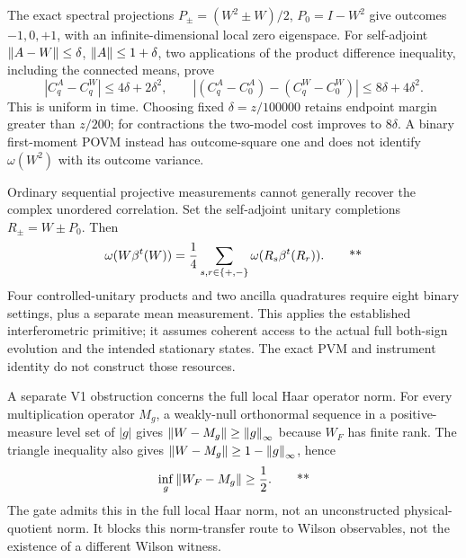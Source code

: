 The exact spectral projections
$P_\pm=(W^2\pm W)/2$, $P_0=I-W^2$ give outcomes $-1,0,+1$, with an
infinite-dimensional local zero eigenspace.  For self-adjoint
$\left\lVert A-W\right\rVert\le\delta$, $\left\lVert A\right\rVert\le1+\delta$, two applications of the product
difference inequality, including the connected means, prove
\begin{equation}
 |C_q^A-C_q^W|\le4\delta+2\delta^2,\qquad
 |(C_q^A-C_0^A)-(C_q^W-C_0^W)|\le8\delta+4\delta^2.
 \label{recent:readout-transfer}
\end{equation}
This is uniform in time.  Choosing fixed $\delta=z/100000$ retains endpoint
margin greater than $z/200$; for contractions the two-model cost improves to
$8\delta$.  A binary first-moment POVM instead has outcome-square one and does
not identify $\omega(W^2)$ with its outcome variance.

Ordinary sequential projective measurements cannot generally recover the
complex unordered correlation.  Set the self-adjoint unitary completions
$R_\pm=W\pm P_0$.  Then
\begin{equation}
 \omega(W\beta^t(W))=\frac14\sum_{s,r\in\{+,-\}}
 \omega(R_s\beta^t(R_r)).\qquad\text{**}
 \label{recent:coherent-readout}
\end{equation}
Four controlled-unitary products and two ancilla quadratures require eight
binary settings, plus a separate mean measurement.  This applies the established
interferometric primitive; it assumes coherent access to the actual full
both-sign evolution and the intended stationary states.  The exact PVM and
instrument identity do not construct those resources.

A separate V1 obstruction concerns the full local Haar operator norm.
For every multiplication operator $M_g$, a weakly-null orthonormal sequence
in a positive-measure level set of $|g|$ gives
$\left\lVert W-M_g\right\rVert\ge\left\lVert g\right\rVert_\infty$ because $W_F$ has finite rank.  The triangle
inequality also gives $\left\lVert W-M_g\right\rVert\ge1-\left\lVert g\right\rVert_\infty$, hence
\begin{equation}
 \inf_g\left\lVert W_F-M_g\right\rVert\ge\frac12.\qquad\text{**}
 \label{recent:multiplier-obstruction}
\end{equation}
The gate admits this in the full local Haar norm, not an unconstructed
physical-quotient norm.  It blocks this norm-transfer route to Wilson observables,
not the existence of a different Wilson witness.

